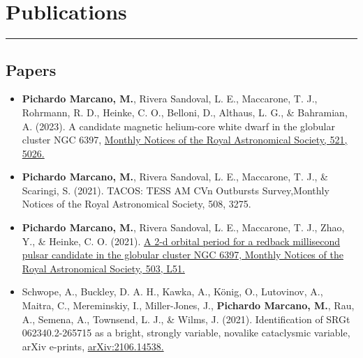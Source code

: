 \documentclass[letterpaper,10pt]{article}
\begin{document}


\section*{Publications }%
\hrule
\vspace{.3 cm}
\subsection*{Papers}
\begin{itemize}[label=$\blacktriangleright$]

\subsubsection*{Refereed}

                \item \textbf{Pichardo Marcano, M.}, Rivera Sandoval, L. E., Maccarone, T. J., Rohrmann, R. D., Heinke, C. O., Belloni, D., Althaus, L. G., \& Bahramian, A. (2023). A candidate magnetic helium-core white dwarf in the globular cluster NGC 6397, \href{https://ui.adsabs.harvard.edu/abs/2023MNRAS.521.5026P/abstract}{Monthly Notices of the Royal Astronomical Society, 521, 5026.}





        
        \item \textbf{Pichardo Marcano, M.}, Rivera Sandoval, L. E., Maccarone, T. J., \& Scaringi, S. (2021). TACOS: TESS AM CVn Outbursts Survey,Monthly Notices of the Royal Astronomical Society, 508, 3275.


        
                
            \item \textbf{Pichardo Marcano, M.}, Rivera Sandoval, L. E., Maccarone, T. J., Zhao, Y., \& Heinke, C. O. (2021). \href{https://ui.adsabs.harvard.edu/abs/2021MNRAS.503L..51P/abstract}{A 2-d orbital period for a redback millisecond pulsar candidate in the globular cluster NGC 6397, Monthly Notices of the Royal Astronomical Society, 503, L51.}
        
        
        \item Schwope, A., Buckley, D. A. H., Kawka, A., K\"onig, O., Lutovinov, A., Maitra, C., Mereminskiy, I., Miller-Jones, J., \textbf{Pichardo Marcano, M.}, Rau, A., Semena, A., Townsend, L. J., \& Wilms, J. (2021). Identification of SRGt 062340.2-265715 as a bright, strongly variable, novalike cataclysmic variable, arXiv e-prints, \href{https://ui.adsabs.harvard.edu/abs/2021arXiv210614538S/abstract}{arXiv:2106.14538.}






\end{itemize}
\end{document}
